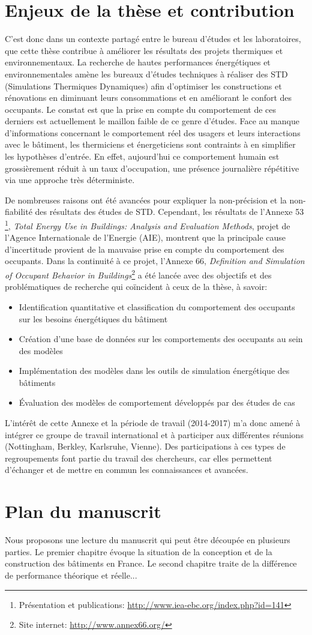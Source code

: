 \section*{Enjeux de la thèse et contribution}

C'est donc dans un contexte partagé entre le bureau d'études et les laboratoires, que cette thèse contribue à améliorer les résultats des projets thermiques et environnementaux. La recherche de hautes performances énergétiques et environnementales amène les bureaux d'études techniques à réaliser des STD (Simulations Thermiques Dynamiques) afin d'optimiser les constructions et rénovations en diminuant leurs consommations et en améliorant le confort des occupants. Le constat est que la prise en compte du comportement de ces derniers est actuellement le maillon faible de ce genre d'études. Face au manque d'informations concernant le comportement réel des usagers et leurs interactions avec le bâtiment, les thermiciens et énergeticiens sont contraints à en simplifier les hypothèses d'entrée. En effet, aujourd'hui ce comportement humain est grossièrement réduit à un taux d'occupation, une présence journalière répétitive via une approche très déterministe.

De nombreuses raisons ont été avancées pour expliquer la non-précision et la non-fiabilité des résultats des études de STD. Cependant, les résultats de l'Annexe 53 \cite{Annex-53-1}\footnote{Présentation et publications: \url{http://www.iea-ebc.org/index.php?id=141}}, \textit{Total Energy Use in Buildings: Analysis and Evaluation Methods}, projet de l'Agence Internationale de l'Energie (AIE), montrent que la principale cause d'incertitude provient de la mauvaise prise en compte du comportement des occupants. Dans la continuité à ce projet, l'Annexe 66, \textit{Definition and Simulation of Occupant Behavior in Buildings}\footnote{Site internet: \url{http://www.annex66.org/}} a été lancée avec des objectifs et des problématiques de recherche qui coïncident à ceux de la thèse, à savoir:
\begin{itemize}
\item Identification quantitative et classification du comportement des occupants sur les besoins énergétiques du bâtiment
\item Création d'une base de données sur les comportements des occupants au sein des modèles
\item Implémentation des modèles dans les outils de simulation énergétique des bâtiments
\item Évaluation des modèles de comportement développés par des études de cas
\end{itemize}
L'intérêt de cette Annexe et la période de travail (2014-2017) m'a donc amené à intégrer ce groupe de travail international et à participer aux différentes réunions (Nottingham, Berkley, Karlsruhe, Vienne). Des participations à ces types de regroupements font partie du travail des chercheurs, car elles permettent d'échanger et de mettre en commun les connaissances et avancées.

\section*{Plan du manuscrit}

Nous proposons une lecture du manuscrit qui peut être découpée en plusieurs parties. Le premier chapitre évoque la situation de la conception et de la construction des bâtiments en France. Le second chapitre traite de la différence de performance théorique et réelle...